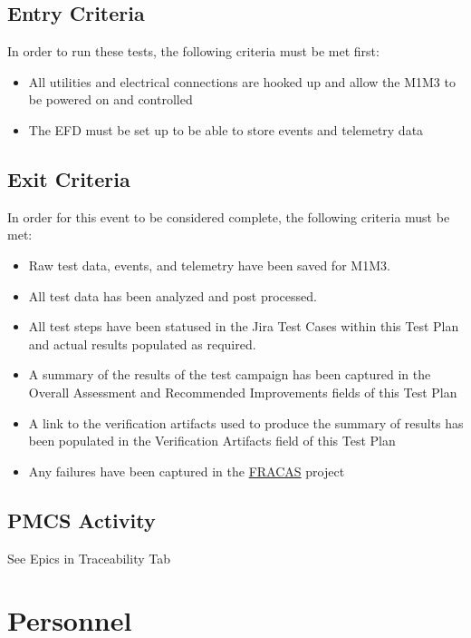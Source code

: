 \documentclass[SE,lsstdraft,STR,toc]{lsstdoc}
\providecommand{\tightlist}{
  \setlength{\itemsep}{0pt}\setlength{\parskip}{0pt}}
\begin{document}
  \subsection{Entry Criteria}
  In order to run these tests, the following criteria must be met first:\\

\begin{itemize}
\tightlist
\item
  All utilities and electrical connections are hooked up and allow the
  M1M3 to be powered on and controlled
\item
  The EFD must be set up to be able to store events and telemetry data
\end{itemize}

  \subsection{Exit Criteria}
  In order for this event to be considered complete, the following
criteria must be met:

\begin{itemize}
\tightlist
\item
  Raw test data, events, and telemetry have been saved for M1M3.
\item
  All test data has been analyzed and post processed.
\item
  All test steps have been statused in the Jira Test Cases within this
  Test Plan and actual results populated as required.
\item
  A summary of the results of the test campaign has been captured in the
  Overall Assessment and Recommended Improvements fields of this Test
  Plan
\item
  A link to the verification artifacts used to produce the summary of
  results has been populated in the Verification Artifacts field of this
  Test Plan
\item
  Any failures have been captured in the
  \href{https://jira.lsstcorp.org/projects/FRACAS/issues/}{FRACAS}
  project
\end{itemize}

  \subsection{PMCS Activity}
  See Epics in Traceability Tab

\newpage
\section{Personnel}
\label{sect:personnel}
\end{document}
